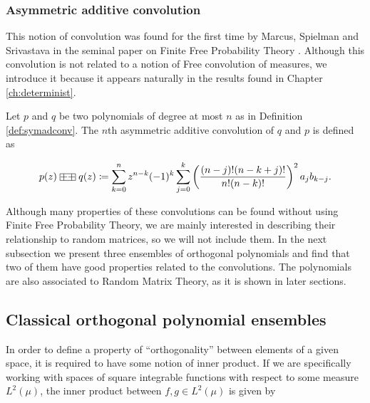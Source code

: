 \subsubsection{Asymmetric additive convolution}

This notion of convolution was found for the first time by Marcus, Spielman and Srivastava in the seminal paper on Finite Free Probability Theory \cite{article:finitefree}. Although this convolution is not related to a notion of Free convolution of measures, we introduce it because it appears naturally in the results found in Chapter \ref{ch:determinist}.


\begin{definition}
    Let $p$ and $q$ be two polynomials of degree at most $n$ as in Definition \ref{def:symadconv}. The $n$th asymmetric additive convolution of $q$ and $p$ is defined as

    \begin{align*}
        p(z) \aac q(z) \coloneqq \sum_{k=0}^n z^{n-k}(-1)^{k} \sum_{j=0}^k \left(\frac{(n-j)!(n-k+j)!}{n!(n-k)!}\right)^2 a_jb_{k-j}.
    \end{align*}
\end{definition}


Although many properties of these convolutions can be found without using Finite Free Probability Theory, we are mainly interested in describing their relationship to random matrices, so we will not include them. In the next subsection we present three ensembles of orthogonal polynomials and find that two of them have good properties related to the convolutions. The polynomials are also associated to Random Matrix Theory, as it is shown in later sections.

\subsection{Classical orthogonal polynomial ensembles}

In order to define a property of ``orthogonality''  between elements of a given space, it is required to have some notion of inner product. If we are specifically working with spaces of square integrable functions with respect to some measure $L^2(\mu)$, the inner product between $f,g \in L^2(\mu)$ is given by

